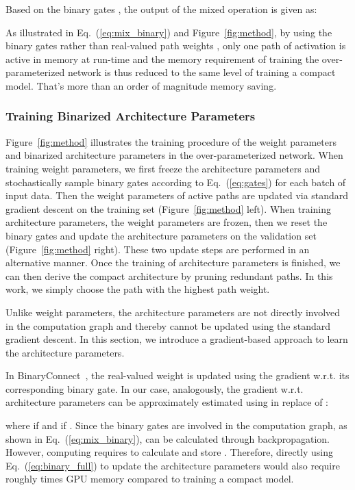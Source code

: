 \documentclass{article} \usepackage{iclr2019_conference,times}
\begin{document}
Based on the binary gates , the output of the mixed operation is given as:


As illustrated in Eq.~(\ref{eq:mix_binary}) and Figure~\ref{fig:method}, by using the binary gates rather than real-valued path weights \citep{liu2018darts}, only one path of activation is active in memory at run-time and the memory requirement of training the over-parameterized network is thus reduced to the same level of training a compact model. That's more than an order of magnitude memory saving. 

\subsubsection{Training Binarized Architecture Parameters}
\label{sec:grad_algo}
Figure~\ref{fig:method} illustrates the training procedure of the weight parameters and binarized architecture parameters in the over-parameterized network. When training weight parameters, we first freeze the architecture parameters and stochastically sample binary gates according to Eq.~(\ref{eq:gates}) for each batch of input data. Then the weight parameters of active paths are updated via standard gradient descent on the training set (Figure~\ref{fig:method} left). When training architecture parameters, the weight parameters are frozen, then we reset the binary gates and update the architecture parameters on the validation set (Figure~\ref{fig:method} right). These two update steps are performed in an alternative manner. Once the training of architecture parameters is finished, we can then derive the compact architecture by pruning redundant paths. In this work, we simply choose the path with the highest path weight.

Unlike weight parameters, the architecture parameters are not directly involved in the computation graph and thereby cannot be updated using the standard gradient descent. In this section, we introduce a gradient-based approach to learn the architecture parameters.

In BinaryConnect~\citep{courbariaux2015binaryconnect}, the real-valued weight is updated using the gradient w.r.t. its corresponding binary gate. In our case, analogously, the gradient w.r.t. architecture parameters can be approximately estimated using  in replace of :

where  if  and  if . Since the binary gates  are involved in the computation graph, as shown in Eq.~(\ref{eq:mix_binary}),  can be calculated through backpropagation. However, computing   requires to calculate and store . Therefore, directly using Eq.~(\ref{eq:binary_full}) to update the architecture parameters would also require roughly  times GPU memory compared to training a compact model.
\end{document}
